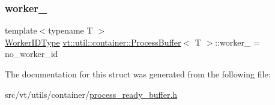 \subsubsection{\texorpdfstring{worker\+\_\+}{worker\_}}
{\footnotesize\ttfamily template$<$typename T $>$ \\
\hyperlink{namespacevt_a656e362091da17b9b93d0655b36e3392}{Worker\+I\+D\+Type} \hyperlink{structvt_1_1util_1_1container_1_1_process_buffer}{vt\+::util\+::container\+::\+Process\+Buffer}$<$ T $>$\+::worker\+\_\+ = no\+\_\+worker\+\_\+id\hspace{0.3cm}{\ttfamily [private]}}



The documentation for this struct was generated from the following file\+:\begin{DoxyCompactItemize}
\item 
src/vt/utils/container/\hyperlink{process__ready__buffer_8h}{process\+\_\+ready\+\_\+buffer.\+h}\end{DoxyCompactItemize}
